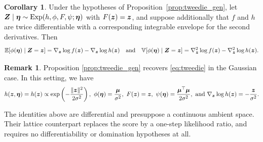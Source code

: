\documentclass{article}
\def\tp{\top}
\theoremstyle{definition}
\newtheorem{corollary}[proposition]{Corollary}
\newtheorem{remark}[proposition]{Remark}
\begin{document}
\begin{corollary}\label{prop:tweedie_gen_coro}
    Under the hypotheses of Proposition~\ref{prop:tweedie_gen}, let $\boldsymbol{Z} \mid \boldsymbol{\eta} \sim \text{Exp}(h, \phi, F, \psi ; \boldsymbol{\eta})$ with $F(\boldsymbol{z}) = \boldsymbol{z}$, and suppose additionally that $f$ and $h$ are twice differentiable with a corresponding integrable envelope for the second derivatives. Then
    \begin{equation*}
        \mathbb{E}[\phi(\boldsymbol{\eta}) \mid \boldsymbol{Z} = \boldsymbol{z}] = \nabla_{\boldsymbol{z}} \log f(\boldsymbol{z}) - \nabla_{\boldsymbol{z}} \log h(\boldsymbol{z}) \quad \text{and} \quad
       \mathbb{V}[\phi(\boldsymbol{\eta}) \mid \boldsymbol{Z} = \boldsymbol{z}] = \nabla_{\boldsymbol{z}}^2 \log f(\boldsymbol{z}) - \nabla_{\boldsymbol{z}}^2 \log h(\boldsymbol{z}).
    \end{equation*}
\end{corollary}

\begin{remark}
    Proposition \ref{prop:tweedie_gen} recovers \eqref{eq:tweedie} in the Gaussian case. In this setting, we have
    \begin{equation*}
        h(\bfz, \bfeta) = h(\bfz) \propto \exp\left(-\frac{\|\bfz\|^2}{2\sigma^2}\right), \,\, \phi(\bfeta) = \frac{\bfmu}{\sigma^2},  \,\, F(\bfz) = \bfz,  \,\,\psi(\bfeta) = \frac{\bfmu^{\tp}\bfmu}{2\sigma^2}, \,\, \text{and} \,\, \nabla_{\bfz} \log h(\bfz) = -\frac{\bfz}{\sigma^2}.
    \end{equation*}
\end{remark}

The identities above are differential and presuppose a continuous ambient space. Their lattice counterpart replaces the score by a one-step likelihood ratio, and requires no differentiability or domination hypotheses at all.
\end{document}
